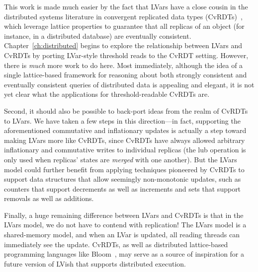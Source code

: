 This work is made much easier by the fact that LVars have a close
cousin in the distributed systems literature in convergent replicated
data types (CvRDTs)~\cite{crdts,crdts-tr}, which leverage lattice
properties to guarantee that all replicas of an object (for instance,
in a distributed database) are eventually consistent.
Chapter~\ref{ch:distributed} begins to explore the relationship
between LVars and CvRDTs by porting LVar-style threshold reads to the
CvRDT setting.  However, there is \emph{much} more work to do here.
Most immediately, although the idea of a single lattice-based
framework for reasoning about both strongly consistent and eventually
consistent queries of distributed data is appealing and elegant, it is
not yet clear what the applications for threshold-readable CvRDTs are.

Second, it should also be possible to back-port ideas from the realm
of CvRDTs to LVars.  We have taken a few steps in this direction---in
fact, supporting the aforementioned commutative and inflationary
updates is actually a step toward making LVars more like CvRDTs, since
CvRDTs have always allowed arbitrary inflationary and commutative
writes to individual replicas (the lub operation is only used when
replicas' states are \emph{merged} with one another).  But the LVars
model could further benefit from applying techniques pioneered by
CvRDTs to support data structures that allow seemingly non-monotonic
updates, such as counters that support decrements as well as
increments and sets that support removals as well as additions.

Finally, a huge remaining difference between LVars and CvRDTs is that
in the LVars model, we do not have to contend with replication!  The
LVars model is a shared-memory model, and when an LVar is updated, all
reading threads can immediately see the update.  CvRDTs, as well as
distributed lattice-based programming languages like
Bloom~\cite{bloom-cidr, blooml}, may serve as a source of inspiration
for a future version of LVish that supports distributed execution.



\fi
